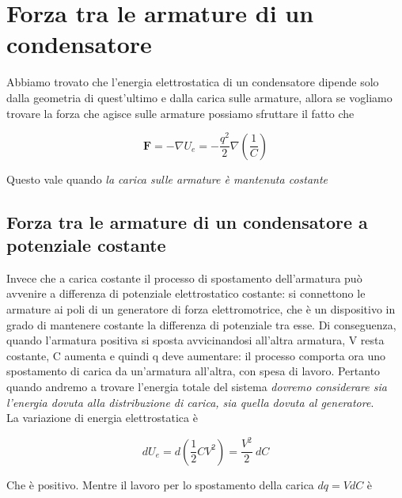 \section{Forza tra le armature di un condensatore}

Abbiamo trovato che l'energia elettrostatica di un condensatore dipende solo dalla geometria di quest'ultimo e dalla carica sulle armature, allora se vogliamo trovare la forza che agisce sulle armature possiamo sfruttare il fatto che 

\begin{tcolorbox}[colback=yellow!10!white, colframe=orange!70!black, boxrule=0.8pt]
\begin{equation}
    \mathbf{F} = - \nabla U_e = - \frac{q^2}{2} \nabla \left( \frac{1}{C} \right)
\end{equation}
\end{tcolorbox}

Questo vale quando \emph{la carica sulle armature è mantenuta costante}

\newpage

\subsection{Forza tra le armature di un condensatore a potenziale costante}

Invece che a carica costante il processo di spostamento dell'armatura può avvenire a differenza di potenziale elettrostatico costante: si connettono le armature ai poli di un generatore di forza elettromotrice, che è un dispositivo in grado di mantenere costante la differenza di potenziale tra esse. Di conseguenza, quando l'armatura positiva si sposta avvicinandosi all'altra armatura, V resta costante, C aumenta e quindi q deve aumentare: il processo comporta ora uno spostamento di carica da un'armatura all'altra, con spesa di lavoro. 
Pertanto quando andremo a trovare l'energia totale del sistema \emph{dovremo considerare sia l'energia dovuta alla distribuzione di carica, sia quella dovuta al generatore}.\\

La variazione di energia elettrostatica è 

\begin{equation}
    dU_e = d \left(\frac{1}{2} CV^2\right) = \frac{V^2}{2} \ dC
\end{equation}

Che è positivo. Mentre il lavoro per lo spostamento della carica $dq = V dC$ è 

